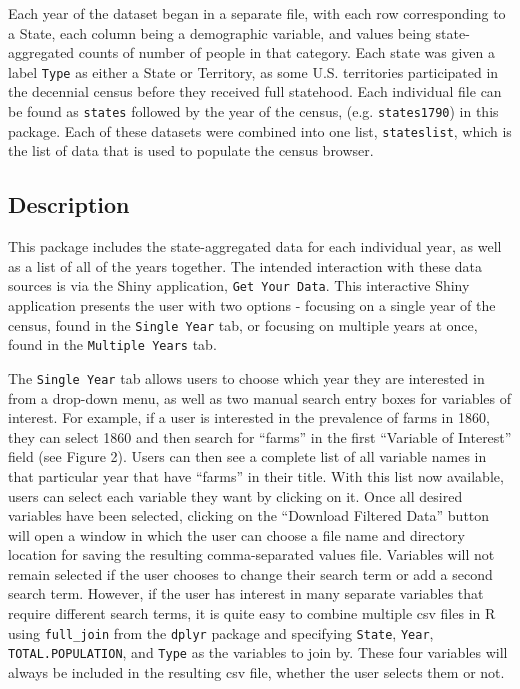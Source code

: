\documentclass[11pt,]{article}
\begin{document}
Each year of the dataset began in a separate file, with each row
corresponding to a State, each column being a demographic variable, and
values being state-aggregated counts of number of people in that
category. Each state was given a label \texttt{Type} as either a State
or Territory, as some U.S. territories participated in the decennial
census before they received full statehood. Each individual file can be
found as \texttt{states} followed by the year of the census, (e.g.
\texttt{states1790}) in this package. Each of these datasets were
combined into one list, \texttt{stateslist}, which is the list of data
that is used to populate the census browser.

\subsection{Description}

This package includes the state-aggregated data for each individual
year, as well as a list of all of the years together. The intended
interaction with these data sources is via the Shiny application,
\texttt{Get\ Your\ Data}. This interactive Shiny application presents
the user with two options - focusing on a single year of the census,
found in the \texttt{Single\ Year} tab, or focusing on multiple years at
once, found in the \texttt{Multiple\ Years} tab.

The \texttt{Single\ Year} tab allows users to choose which year they are
interested in from a drop-down menu, as well as two manual search entry
boxes for variables of interest. For example, if a user is interested in
the prevalence of farms in 1860, they can select 1860 and then search
for ``farms'' in the first ``Variable of Interest'' field (see Figure
2). Users can then see a complete list of all variable names in that
particular year that have ``farms'' in their title. With this list now
available, users can select each variable they want by clicking on it.
Once all desired variables have been selected, clicking on the
``Download Filtered Data'' button will open a window in which the user
can choose a file name and directory location for saving the resulting
comma-separated values file. Variables will not remain selected if the
user chooses to change their search term or add a second search term.
However, if the user has interest in many separate variables that
require different search terms, it is quite easy to combine multiple csv
files in R using \texttt{full\_join} from the \texttt{dplyr} package and
specifying \texttt{State}, \texttt{Year}, \texttt{TOTAL.POPULATION}, and
\texttt{Type} as the variables to join by. These four variables will
always be included in the resulting csv file, whether the user selects
them or not.
\end{document}
